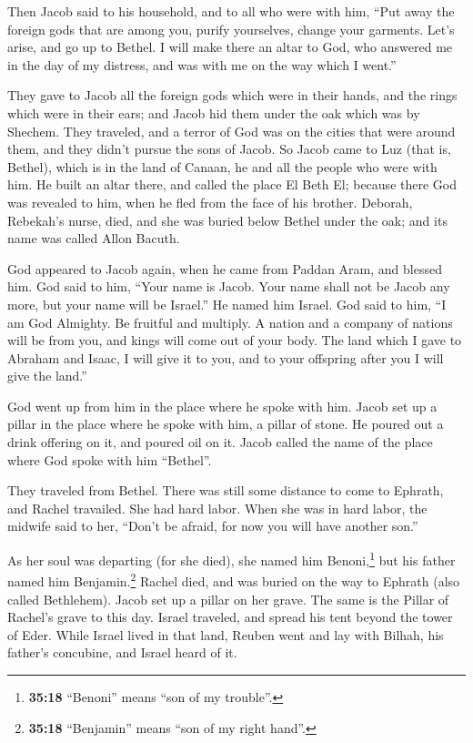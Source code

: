  Then Jacob said to his household, and to all who were
with him, ``Put away the foreign gods that are among you, purify
yourselves, change your garments.  Let's arise, and go up
to Bethel. I will make there an altar to God, who answered me in the day
of my distress, and was with me on the way which I went.''

 They gave to Jacob all the foreign gods which were in
their hands, and the rings which were in their ears; and Jacob hid them
under the oak which was by Shechem.  They traveled, and a
terror of God was on the cities that were around them, and they didn't
pursue the sons of Jacob.  So Jacob came to Luz (that is,
Bethel), which is in the land of Canaan, he and all the people who were
with him.  He built an altar there, and called the place
El Beth El; because there God was revealed to him, when he fled from the
face of his brother.  Deborah, Rebekah's nurse, died, and
she was buried below Bethel under the oak; and its name was called Allon
Bacuth.

 God appeared to Jacob again, when he came from Paddan
Aram, and blessed him.  God said to him, ``Your name is
Jacob. Your name shall not be Jacob any more, but your name will be
Israel.'' He named him Israel.  God said to him, ``I am
God Almighty. Be fruitful and multiply. A nation and a company of
nations will be from you, and kings will come out of your body.
 The land which I gave to Abraham and Isaac, I will give
it to you, and to your offspring after you I will give the land.''

 God went up from him in the place where he spoke with
him.  Jacob set up a pillar in the place where he spoke
with him, a pillar of stone. He poured out a drink offering on it, and
poured oil on it.  Jacob called the name of the place
where God spoke with him ``Bethel''.

 They traveled from Bethel. There was still some distance
to come to Ephrath, and Rachel travailed. She had hard labor.
 When she was in hard labor, the midwife said to her,
``Don't be afraid, for now you will have another son.''

 As her soul was departing (for she died), she named him
Benoni,\footnote{\textbf{35:18} ``Benoni'' means ``son of my trouble''.}
but his father named him Benjamin.\footnote{\textbf{35:18} ``Benjamin''
  means ``son of my right hand''.}  Rachel died, and was
buried on the way to Ephrath (also called Bethlehem). 
Jacob set up a pillar on her grave. The same is the Pillar of Rachel's
grave to this day.  Israel traveled, and spread his tent
beyond the tower of Eder.  While Israel lived in that
land, Reuben went and lay with Bilhah, his father's concubine, and
Israel heard of it.

